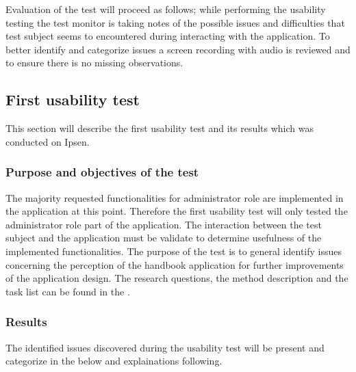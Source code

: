 Evaluation of the test will proceed as follows; while performing the usability testing the test monitor is taking notes of the possible issues and difficulties that test subject seems to encountered during interacting with the application. 
To better identify and categorize issues a screen recording with audio is reviewed and to ensure there is no missing observations.

\subsection{First usability test}
This section will describe the first usability test and its results which was conducted on Ipsen. 

\subsubsection{Purpose and objectives of the test}
The majority requested functionalities for administrator role are implemented in the application at this point. 
Therefore the first usability test will only tested the administrator role part of the application.
The interaction between the test subject and the application must be validate to determine usefulness of the implemented functionalities. 
The purpose of the test is to general identify issues concerning the perception of the handbook application for further improvements of the application design.
The research questions, the method description and the task list can be found in the .

\subsubsection{Results}
The identified issues discovered during the usability test will be present and categorize in the  below and explainations following. 

